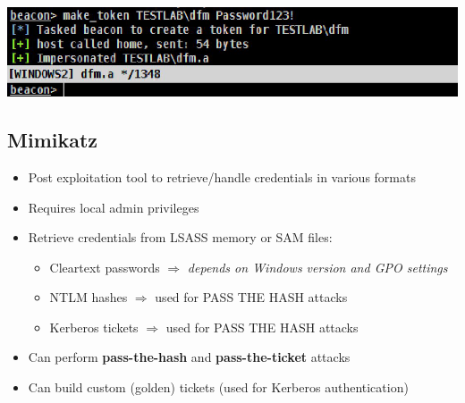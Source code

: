 \begin{center}
    \includegraphics[width=\textwidth]{resources/11-impersonating-tokens-cobalt-strike-2.png}
\end{center}

\subsection{Mimikatz}

\begin{itemize}
   \item Post exploitation tool to retrieve/handle credentials in various formats
   \item Requires local admin privileges
   \item Retrieve credentials from LSASS memory or SAM files:
   \begin{itemize}
       \item Cleartext passwords \hspace{1cm} $\Rightarrow$ \textit{depends on Windows version and GPO settings}
       \item NTLM hashes \hspace{1.5cm} $\Rightarrow$ used for PASS THE HASH attacks
       \item Kerberos tickets \hspace{1.2cm} $\Rightarrow$ used for PASS THE HASH attacks
   \end{itemize}
   \item Can perform \textbf{pass-the-hash} and \textbf{pass-the-ticket} attacks
   \item Can build custom (golden) tickets (used for Kerberos authentication)
\end{itemize}

